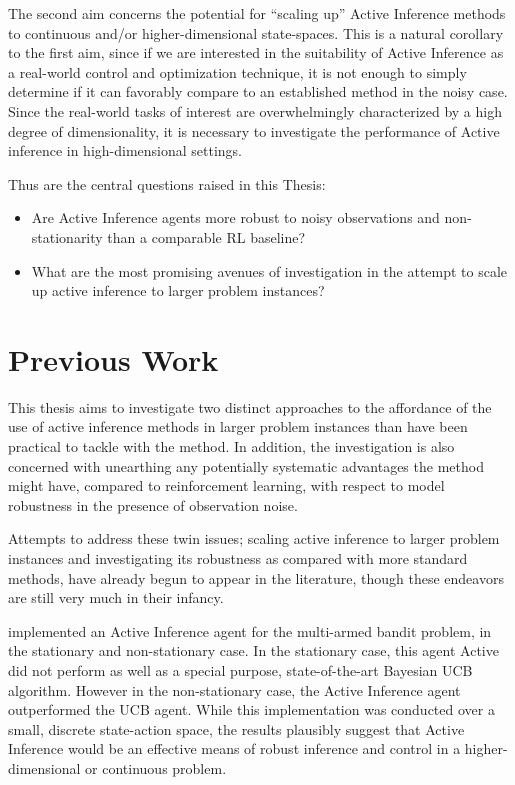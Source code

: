 \documentclass[12pt, oneside]{article}
\begin{document}
The second aim concerns the potential for ``scaling up'' Active Inference methods to continuous and/or higher-dimensional state-spaces. This is a natural corollary to the first aim, since if we are interested in the suitability of Active Inference as a real-world control and optimization technique, it is not enough to simply determine if it can favorably compare to an established method in the noisy case. Since the real-world tasks of interest are overwhelmingly characterized by a high degree of dimensionality, it is necessary to investigate the performance of Active inference in high-dimensional settings.  

Thus are the central questions raised in this Thesis:

\begin{itemize}
\item Are Active Inference agents more robust to noisy observations and non-stationarity than a comparable RL baseline?
\item What are the most promising avenues of investigation in the attempt to scale up active inference to larger problem instances? 
\end{itemize} 

\section{Previous Work}

This thesis aims to investigate two distinct approaches to the affordance of the use of active inference methods in larger problem instances than have been practical to tackle with the method. In addition, the investigation is also concerned with unearthing any potentially systematic advantages the method might have, compared to reinforcement learning, with respect to model robustness in the presence of observation noise.

Attempts to address these twin issues; scaling active inference to larger problem instances and investigating its robustness as compared with more standard methods, have already begun to appear in the literature, though these endeavors are still very much in their infancy. 

\textcite{Emperical-Eval-AIF-Multi-Arm-Bandits} implemented an Active Inference agent for the multi-armed bandit problem, in the stationary and non-stationary case. In the stationary case, this agent Active did not perform as well as a special purpose, state-of-the-art Bayesian UCB algorithm. However in the non-stationary case, the Active Inference agent outperformed the UCB agent. While this implementation was conducted over a small, discrete state-action space, the results plausibly suggest that Active Inference would be an effective means of robust inference and control in a higher-dimensional or continuous problem.  
\end{document}
